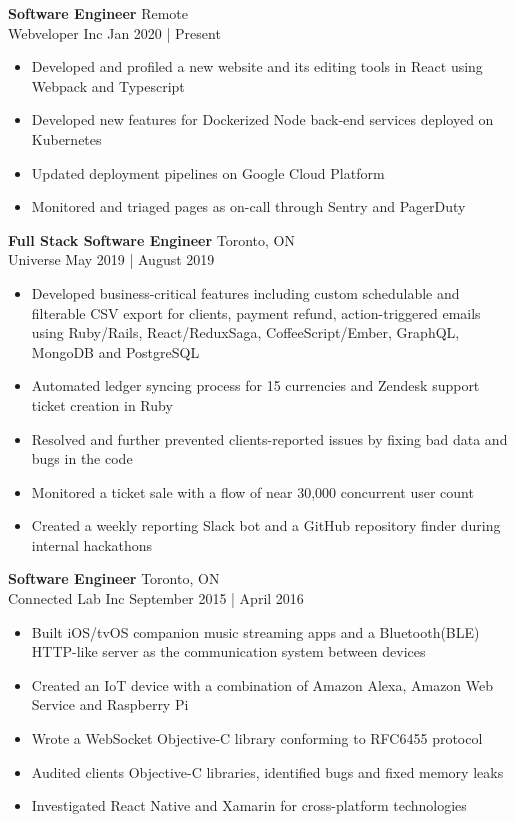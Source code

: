 \documentclass[a4paper]{article}
\begin{document}
\textbf{\normalsize Software Engineer} \hfill Remote\\
\textcolor{jobGray}{Webveloper Inc} \hfill \textcolor{dateGray}{Jan 2020 | Present}\\
\vspace{-2mm}
\begin{itemize}[leftmargin=1cm ] \itemsep -0.5pt
	\item Developed and profiled a new website and its editing tools in React using Webpack and Typescript
	\item Developed new features for Dockerized Node back-end services deployed on Kubernetes
	\item Updated deployment pipelines on Google Cloud Platform
  \item Monitored and triaged pages as on-call through Sentry and PagerDuty
\end{itemize}
\textbf{\normalsize Full Stack Software Engineer} \hfill Toronto, ON\\
\textcolor{jobGray}{Universe} \hfill \textcolor{dateGray}{May 2019 | August 2019}\\
\vspace{-2mm}
\begin{itemize}[leftmargin=1cm ] \itemsep -0.5pt
	\item Developed business-critical features including custom schedulable and filterable CSV export for clients, payment refund, action-triggered emails using Ruby/Rails, React/ReduxSaga, CoffeeScript/Ember, GraphQL, MongoDB and PostgreSQL  
	\item Automated ledger syncing process for 15 currencies and Zendesk support ticket creation in Ruby
	\item Resolved and further prevented clients-reported issues by fixing bad data and bugs in the code
	\item Monitored a ticket sale with a flow of near 30,000 concurrent user count
	\item Created a weekly reporting Slack bot and a GitHub repository finder during internal hackathons 
\end{itemize}
\textbf{\normalsize Software Engineer} \hfill Toronto, ON\\ 
\textcolor{jobGray}{Connected Lab Inc} \hfill \textcolor{dateGray}{September 2015 | April 2016}\\
\vspace{-2mm}
\begin{itemize}[leftmargin=1cm ] \itemsep -0.5pt
	\item Built iOS/tvOS companion music streaming apps and a Bluetooth(BLE) HTTP-like server as the communication system between devices
	\item Created an IoT device with a combination of Amazon Alexa, Amazon Web Service and Raspberry Pi
	\item Wrote a WebSocket Objective-C library conforming to RFC6455 protocol
	\item Audited client\textquotesingle{}s Objective-C libraries, identified bugs and fixed memory leaks 
	\item Investigated React Native and Xamarin for cross-platform technologies
\end{itemize}
\end{document}

